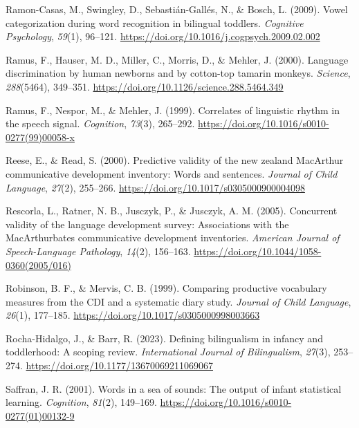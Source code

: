 \documentclass[
  12pt,
  b5paperpaper,
  twoside]{scrreprt}
\newlength{\cslhangindent}
\newlength{\cslentryspacingunit} %
\newenvironment{CSLReferences}[2] %
 {%
  \setlength{\parindent}{0pt}
  \ifodd #1
  \let\oldpar\par
  \def\par{\hangindent=\cslhangindent\oldpar}
  \fi
  \setlength{\parskip}{#2\cslentryspacingunit}
 }%
 {}
\begin{document}
\begin{CSLReferences}{1}{0}
\leavevmode{}%
Ramon-Casas, M., Swingley, D., Sebastián-Gallés, N., \& Bosch, L.
(2009). Vowel categorization during word recognition in bilingual
toddlers. \emph{Cognitive Psychology}, \emph{59}(1), 96--121.
\url{https://doi.org/10.1016/j.cogpsych.2009.02.002}

\leavevmode{}%
Ramus, F., Hauser, M. D., Miller, C., Morris, D., \& Mehler, J. (2000).
Language discrimination by human newborns and by cotton-top tamarin
monkeys. \emph{Science}, \emph{288}(5464), 349--351.
\url{https://doi.org/10.1126/science.288.5464.349}

\leavevmode{}%
Ramus, F., Nespor, M., \& Mehler, J. (1999). Correlates of linguistic
rhythm in the speech signal. \emph{Cognition}, \emph{73}(3), 265--292.
\url{https://doi.org/10.1016/s0010-0277(99)00058-x}

\leavevmode{}%
Reese, E., \& Read, S. (2000). Predictive validity of the new zealand
{MacArthur} communicative development inventory: Words and sentences.
\emph{Journal of Child Language}, \emph{27}(2), 255--266.
\url{https://doi.org/10.1017/s0305000900004098}

\leavevmode{}%
Rescorla, L., Ratner, N. B., Jusczyk, P., \& Jusczyk, A. M. (2005).
Concurrent validity of the language development survey: Associations
with the {MacArthur}{\textemdash}bates communicative development
inventories. \emph{American Journal of Speech-Language Pathology},
\emph{14}(2), 156--163.
\url{https://doi.org/10.1044/1058-0360(2005/016)}

\leavevmode{}%
Robinson, B. F., \& Mervis, C. B. (1999). Comparing productive
vocabulary measures from the {CDI} and a systematic diary study.
\emph{Journal of Child Language}, \emph{26}(1), 177--185.
\url{https://doi.org/10.1017/s0305000998003663}

\leavevmode{}%
Rocha-Hidalgo, J., \& Barr, R. (2023). Defining bilingualism in infancy
and toddlerhood: A scoping review. \emph{International Journal of
Bilingualism}, \emph{27}(3), 253--274.
\url{https://doi.org/10.1177/13670069211069067}

\leavevmode{}%
Saffran, J. R. (2001). Words in a sea of sounds: The output of infant
statistical learning. \emph{Cognition}, \emph{81}(2), 149--169.
\url{https://doi.org/10.1016/s0010-0277(01)00132-9}


\end{CSLReferences}
\end{document}
